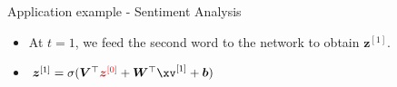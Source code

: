 \begin{frame} {Application example - Sentiment Analysis}
  \begin{itemize}
    \item At $t = 1$, we feed the second word to the network to obtain $\bm{z}^{[1]}$.
    \item $\bm{z}^{[1]} = \sigma(\bm{V}^\top\textcolor{red}{\bm{z}^{[0]}} + \bm{W}^\top \xv^{[1]} + \bm{b})$
  \end{itemize}
  \begin{figure}
      \centering
  \end{figure}
\end{frame}

